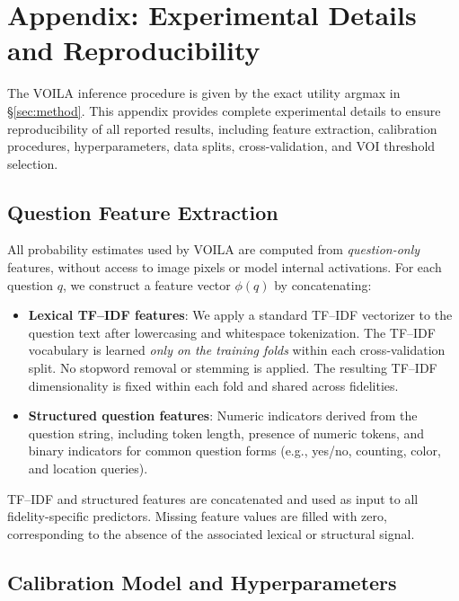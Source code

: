 \section{Appendix: Experimental Details and Reproducibility}
\label{sec:experimental}
\label{sec:reproducibility}

The \textsc{VOILA} inference procedure is given by the exact utility argmax
in \S\ref{sec:method}.
This appendix provides complete experimental details to ensure reproducibility of all reported results, including feature extraction, calibration procedures, hyperparameters, data splits, cross-validation, and VOI threshold selection.

\subsection{Question Feature Extraction}
\label{sec:features}

All probability estimates used by \textsc{VOILA} are computed from \emph{question-only} features, without access to image pixels or model internal activations.
For each question $q$, we construct a feature vector $\phi(q)$ by concatenating:

\begin{itemize}
    \item \textbf{Lexical TF--IDF features}: We apply a standard TF--IDF vectorizer to the question text after lowercasing and whitespace tokenization.
    The TF--IDF vocabulary is learned \emph{only on the training folds} within each cross-validation split.
    No stopword removal or stemming is applied.
    The resulting TF--IDF dimensionality is fixed within each fold and shared across fidelities.
    
    \item \textbf{Structured question features}: Numeric indicators derived from the question string, including token length, presence of numeric tokens, and binary indicators for common question forms (e.g., yes/no, counting, color, and location queries).
\end{itemize}

TF--IDF and structured features are concatenated and used as input to all fidelity-specific predictors.
Missing feature values are filled with zero, corresponding to the absence of the associated lexical or structural signal.

\subsection{Calibration Model and Hyperparameters}
\label{sec:hyperparams}

